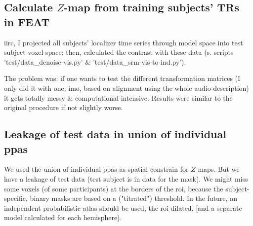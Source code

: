 \subsection{Calculate $Z$-map from training subjects' TRs in FEAT}

iirc, I projected all subjects' localizer time series through
model space into test subject voxel space; then, calculated the contrast
with these data (s. scripts 'test/data\_denoise-vis.py' \&
'test/data\_srm-vis-to-ind.py').
%

The problem was: if one wants to test the different transformation matrices (I
only did it with one; imo, based on alignment using the whole audio-description)
it gets totally messy \& computational intensive.
%
Results were similar to the original procedure if not slightly worse.


\subsection{Leakage of test data in union of individual \acp{ppa}}

%
We used the union of individual \acp{ppa} as spatial constrain for $Z$-maps.
%
But we have a leakage of test data (test subject is in data for the mask).
%
We might miss some voxels (of some participants) at the borders of the \ac{roi},
because the subject-specific, binary masks are based on a ("titrated")
threshold.  \citep{sengupta2016extension}
%
In the future, an independent probabilistic atlas should be used, the \ac{roi}
dilated, [and a separate model calculated for each hemisphere].
